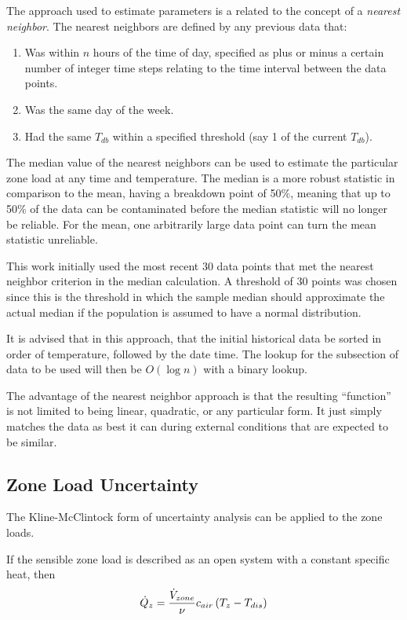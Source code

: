 The approach used to estimate parameters is a related to the concept of
a \textit{nearest neighbor}. The nearest neighbors are defined by any
previous data that:

\begin{enumerate}
    \item Was within \(n\) hours of the time of day, specified as
        plus or minus a certain number of integer time steps relating to
        the time interval between the data points.
\item Was the same day of the week.
\item Had the same \(T_{db}\) within a specified threshold (say \SI{1}{\degreeF} of the current \(T_{db}\)).
\end{enumerate}

The median value of the nearest neighbors can be used to estimate the
particular zone load at any time and temperature.  The median is a more robust
statistic in comparison to the mean, having a breakdown point of 50\%, meaning
that up to 50\% of the data can be contaminated before the median statistic
will no longer be reliable. For the mean, one arbitrarily large data point can
turn the mean statistic unreliable.

This work initially used the most recent 30 data points that met the
nearest neighbor criterion in the median calculation. A threshold of 30
points was chosen since this is the threshold in which the sample median
should approximate the actual median if the population is assumed to
have a normal distribution.

It is advised that in this approach, that the initial historical data be sorted
in order of temperature, followed by the date time.  The lookup for the
subsection of data to be used will then be \(O\left(\log n \right)\) with a
binary lookup.

The advantage of the nearest neighbor approach is that the resulting ``function''
is not limited to being linear, quadratic, or any particular form. It just
simply matches the data as best it can during external conditions that are
expected to be similar.

\subsection{Zone Load Uncertainty}

The Kline-McClintock form of uncertainty analysis can be applied to the
zone loads.

If the sensible zone load is described as an open system with a constant specific
heat, then
\begin{equation}
    \dot{Q}_{z} =  \frac{\dot{V}_{zone}}{\nu} c_{air} \left(T_{z} - T_{dis}\right)
\end{equation}

